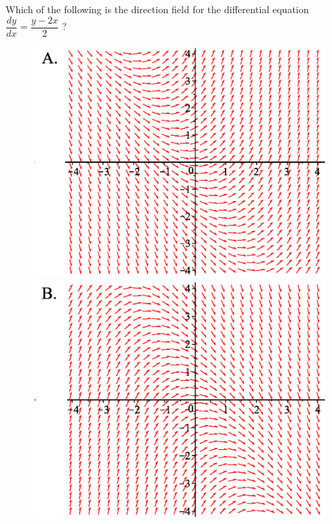 \documentclass[noauthor]{ximera}
\begin{document}
\begin{problem} 
Which of the following is the direction field for the differential equation $\dfrac{dy}{dx} = \dfrac{y-2x}{2}$ ?


 \begin{figure}[!htb]
 \hspace{10mm}  
\includegraphics[width=\linewidth]{MCA.eps} 

  \endminipage \hspace{10mm} 
%
  \includegraphics[width=\linewidth]{MCB.eps}


\end{figure}
\end{problem}
\end{document}
